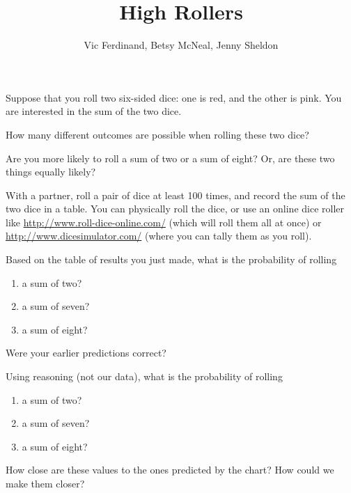 \documentclass{ximera}
\title{High Rollers}
\author{Vic Ferdinand, Betsy McNeal, Jenny Sheldon}
\begin{document}
\begin{abstract}
\end{abstract}
\maketitle



Suppose that you roll two six-sided dice: one is red, and the other is pink.  You are interested in the sum of the two dice.

\begin{problem}
How many different outcomes are possible when rolling these two dice?
\end{problem}

\begin{problem} 
Are you more likely to roll a sum of two or a sum of eight?  Or, are these two things equally likely?
\end{problem}

With a partner, roll a pair of dice at least 100 times, and record the sum of the two dice in a table.  You can physically roll the dice, or use an online dice roller like \url{http://www.roll-dice-online.com/} (which will roll them all at once) or \url{http://www.dicesimulator.com/} (where you can tally them as you roll).


\begin{problem}
Based on the table of results you just made, what is the probability of rolling
\begin{enumerate}
\item a sum of two?
\item a sum of seven?
\item a sum of eight?
\end{enumerate}
Were your earlier predictions correct?
\end{problem}

\begin{problem}
Using reasoning (not our data), what is the probability of rolling
\begin{enumerate}
\item a sum of two?
\item a sum of seven?
\item a sum of eight?
\end{enumerate}
How close are these values to the ones predicted by the chart?  How could we make them closer?
\end{problem}
\end{document}
